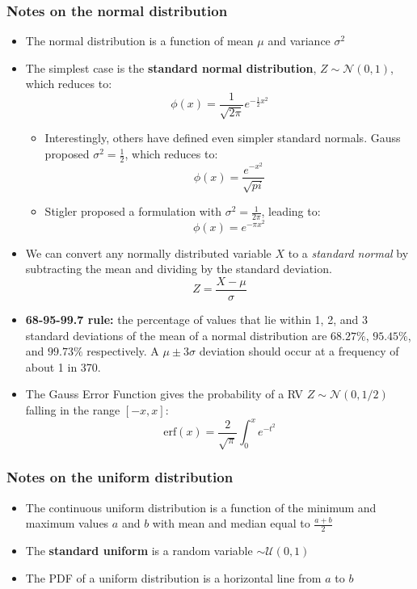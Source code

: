 \documentclass{article}
\begin{document}
\begin{multicols*}{2}
\begin{itemize}
\end{itemize}

\subsubsection{Notes on the normal distribution}
\begin{itemize}
    \item The normal distribution is a function of mean $\mu$ and variance $\sigma^2$
    \item The simplest case is the \textbf{standard normal distribution}, $Z \sim \mathcal{N}(0, 1)$, which reduces to:
    $$\phi(x) = \frac{1}{\sqrt{2\pi}}e^{-\frac{1}{2}x^2}$$

    \begin{itemize}
        \item Interestingly, others have defined even simpler standard normals. Gauss proposed $\sigma^2 = \frac{1}{2}$, which reduces to:
        $$\phi(x) = \frac{e^{-x^2}}{\sqrt{pi}}$$

        \item Stigler proposed a formulation with $\sigma^2 = \frac{1}{2\pi}$, leading to:
        $$\phi(x) = e^{-\pi x^2}$$

    \end{itemize}
    \item We can convert any normally distributed variable $X$ to a \emph{standard normal} by subtracting the mean and dividing by the standard deviation.
    $$ Z = \frac{X - \mu}{\sigma} $$
    \item \textbf{68-95-99.7 rule:} the percentage of values that lie within 1, 2, and 3 standard deviations of the mean of a normal distribution are $68.27\%$, $95.45\%$, and $99.73\%$ respectively. A $\mu \pm 3\sigma$ deviation should occur at a frequency of about 1 in 370.
    \item The Gauss Error Function gives the probability of a RV $Z \sim \mathcal{N}(0, 1/2)$ falling in the range $[-x, x]$:
    $$ \mathrm{erf}(x) = \frac{2}{\sqrt{\pi}}\int_{0}^{x}e^{-t^2}$$

\end{itemize}

\subsubsection{Notes on the uniform distribution}
\begin{itemize}
    \item The continuous uniform distribution is a function of the minimum and maximum values  $a$ and $b$ with mean and median equal to $\frac{a+b}{2}$
    \item The \textbf{standard uniform} is a random variable $\sim \mathcal{U}(0, 1)$
    \item The PDF of a uniform distribution is a horizontal line from $a$ to $b$
\end{itemize}

\end{multicols*}
\end{document}
